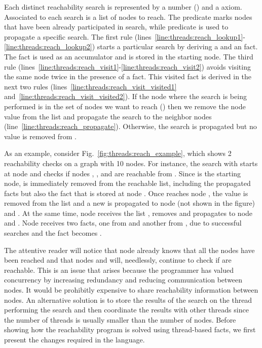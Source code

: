 Each distinct reachability search is represented by a number () and a
 axiom. Associated to each search  is a list of nodes to
reach.  The predicate  marks nodes that have been already
participated in search, while predicate  is used to propagate a
specific search. The first rule
(lines~\ref{line:threads:reach_lookup1}-\ref{line:threads:reach_lookup2}) starts
a particular search by deriving a  and an  fact.
The  fact is used as an accumulator and is stored in the starting
node. The third rule
(lines~\ref{line:threads:reach_visit1}-\ref{line:threads:reach_visit2}) avoids
visiting the same node twice in the presence of a  fact.  This
visited fact is derived in the next two rules
(lines~\ref{line:threads:reach_visit_visited1}
and~\ref{line:threads:reach_visit_visited2}).  If the node where the search is
being performed is in the set of nodes we want to reach () then we
remove the node value from the list and propagate the search to the neighbor
nodes (line~\ref{line:threads:reach_propagate}).  Otherwise, the search is
propagated but no value is removed from .

As an example, consider Fig.~\ref{fig:threads:reach_example}, which shows 2
reachability checks on a graph with 10 nodes. For instance, the search with
 starts at node  and checks if nodes , ,
and  are reachable from . Since  is the starting
node,  is immediately removed from the reachable list, including the
propagated  facts but also the  fact that is stored
at node . Once  reaches node , the value
 is removed from the list and a new  is propagated to
node  (not shown in the figure) and . At the same time, node
 receives the list \code{[2,3]}, removes  and propagates
\code{[3]} to node  and . Node  receives two
 facts, one from  and another from , due to
successful searches and the  fact becomes .

The attentive reader will notice that node  already knows that all the
nodes have been reached and that nodes  and  will, needlessly,
continue to check if \code{[2,3]} are reachable. This is an issue that arises
because the programmer has valued concurrency by increasing redundancy and
reducing communication between nodes. It would be prohibitly expensive to share
reachability information between nodes. An alternative solution is to store the
results of the search on the thread performing the search and then coordinate
the results with other threads since the number of threads is usually smaller
than the number of nodes. Before showing how the reachability program is solved
using thread-based facts, we first present the changes required in the language.

